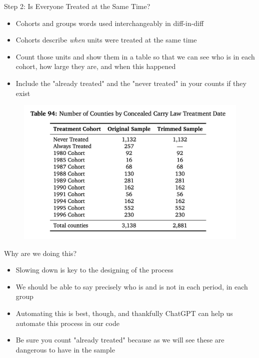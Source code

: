 \documentclass{beamer}
\begin{document}
\begin{frame}{Step 2: Is Everyone Treated at the Same Time?}

\begin{itemize}
\item Cohorts and groups words used interchangeably in diff-in-diff
\item Cohorts describe \emph{when} units were treated at the same time
\item Count those units and show them in a table so that we can see who is in each cohort, how large they are, and when this happened
\item Include the "already treated" and the "never treated" in your counts if they exist
\end{itemize}

\end{frame}

\begin{frame}

\begin{figure}
    \centering
    \includegraphics[height=0.8\textheight]{./lecture_includes/treated_at_same_time}
\end{figure}

\end{frame}


\begin{frame}{Why are we doing this?}

\begin{itemize}

\item Slowing down is key to the designing of the process
\item We should be able to say precisely who is and is not in each period, in each group
\item Automating this is best, though, and thankfully ChatGPT can help us automate this process in our code
\item Be sure you count "already treated" because as we will see these are dangerous to have in the sample
\end{itemize}

\end{frame}
\end{document}
